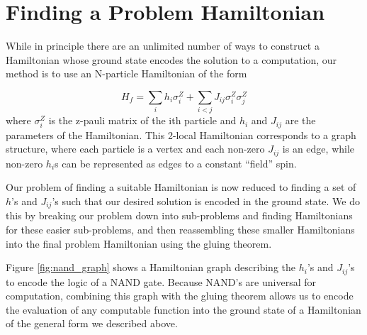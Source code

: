 \section{Finding a Problem Hamiltonian}
\label{sec:prob_ham}
While in principle there are an unlimited number of ways to construct a Hamiltonian whose ground state encodes the solution to a computation, our method is to use an N-particle Hamiltonian of the form

\begin{equation}
	H_f = \sum_{i} h_i \sigma_i^Z + \sum_{i < j} J_{ij} \sigma_i^Z\sigma_j^Z 
\end{equation}
where $\sigma_i^Z$ is the z-pauli matrix of the ith particle and $h_i$ and $J_{ij}$ are the parameters of the Hamiltonian.  This 2-local Hamiltonian corresponds to a graph structure, where each particle is a vertex and each non-zero $J_{ij}$ is an edge, while non-zero $h_i$s can be represented as edges to a constant ``field'' spin.

Our problem of finding a suitable Hamiltonian is now reduced to finding a set of $h$'s and $J_{ij}$'s such that our desired solution is encoded in the ground state.  We do this by breaking our problem down into sub-problems and finding Hamiltonians for these easier sub-problems, and then reassembling these smaller Hamiltonians into the final problem Hamiltonian using the gluing theorem.\cite{gluing}

Figure \ref{fig:nand_graph} shows a Hamiltonian graph describing the $h_i$'s and $J_{ij}$'s to encode the logic of a NAND gate.  Because NAND's are universal for computation, combining this graph with the gluing theorem allows us to encode the evaluation of any computable function into the ground state of a Hamiltonian of the general form we described above.  

